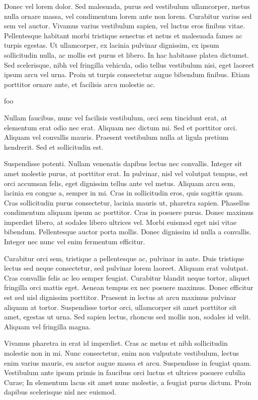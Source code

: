 \documentclass{article}
\begin{document}
Donec vel lorem dolor. Sed malesuada, purus sed vestibulum ullamcorper, metus nulla ornare massa, vel condimentum lorem ante non lorem. Curabitur varius sed sem vel auctor. Vivamus varius vestibulum sapien, vel luctus eros finibus vitae. Pellentesque habitant morbi tristique senectus et netus et malesuada fames ac turpis egestas. Ut ullamcorper, ex lacinia pulvinar dignissim, ex ipsum sollicitudin nulla, ac mollis est purus et libero. In hac habitasse platea dictumst. Sed scelerisque, nibh vel fringilla vehicula, odio tellus vestibulum nisi, eget laoreet ipsum arcu vel urna. Proin ut turpis consectetur augue bibendum finibus. Etiam porttitor ornare ante, et facilisis arcu molestie ac.

foo

Nullam faucibus, nunc vel facilisis vestibulum, orci sem tincidunt erat, at elementum erat odio nec erat. Aliquam nec dictum mi. Sed et porttitor orci. Aliquam vel convallis mauris. Praesent vestibulum nulla at ligula pretium hendrerit. Sed et sollicitudin est.

Suspendisse potenti. Nullam venenatis dapibus lectus nec convallis. Integer sit amet molestie purus, at porttitor erat. In pulvinar, nisl vel volutpat tempus, est orci accumsan felis, eget dignissim tellus ante vel metus. Aliquam arcu sem, lacinia eu congue a, semper in mi. Cras in sollicitudin eros, quis sagittis quam. Cras sollicitudin purus consectetur, lacinia mauris ut, pharetra sapien. Phasellus condimentum aliquam ipsum ac porttitor. Cras in posuere purus. Donec maximus imperdiet libero, at sodales libero ultrices vel. Morbi euismod eget nisi vitae bibendum. Pellentesque auctor porta mollis. Donec dignissim id nulla a convallis. Integer nec nunc vel enim fermentum efficitur.

Curabitur orci sem, tristique a pellentesque ac, pulvinar in ante. Duis tristique lectus sed neque consectetur, sed pulvinar lorem laoreet. Aliquam erat volutpat. Cras convallis felis ac leo semper feugiat. Curabitur blandit neque tortor, aliquet fringilla orci mattis eget. Aenean tempus ex nec posuere maximus. Donec efficitur est sed nisl dignissim porttitor. Praesent in lectus at arcu maximus pulvinar aliquam at tortor. Suspendisse tortor orci, ullamcorper sit amet porttitor sit amet, egestas ut urna. Sed sapien lectus, rhoncus sed mollis non, sodales id velit. Aliquam vel fringilla magna.

Vivamus pharetra in erat id imperdiet. Cras ac metus et nibh sollicitudin molestie non in mi. Nunc consectetur, enim non vulputate vestibulum, lectus enim varius mauris, eu auctor augue massa et arcu. Suspendisse in feugiat quam. Vestibulum ante ipsum primis in faucibus orci luctus et ultrices posuere cubilia Curae; In elementum lacus sit amet nunc molestie, a feugiat purus dictum. Proin dapibus scelerisque nisl nec euismod.
\end{document}
